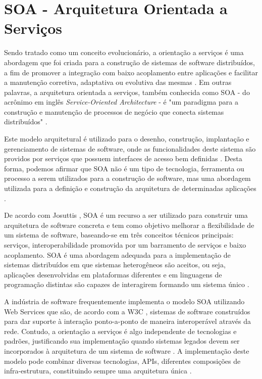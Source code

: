\section{SOA - Arquitetura Orientada a Serviços}

Sendo tratado como um conceito evolucionário, a orientação a serviços é uma abordagem que foi criada para a construção de sistemas de software distribuídos, a fim de promover a integração com baixo acoplamento entre aplicações e facilitar a manutenção corretiva, adaptativa ou evolutiva das mesmas \cite{linthicum_soainrealworld_2007}. Em outras palavras, a arquitetura orientada a serviços, também conhecida como SOA - do acrônimo em inglês \textit{Service-Oriented Architecture} - é "um paradigma para a construção e manutenção de processos de negócio que conecta sistemas distribuídos" \cite{josuttis_soa_2007}.

Este modelo arquitetural é utilizado para o desenho, construção, implantação e gerenciamento de sistemas de software, onde as funcionalidades deste sistema são providos por serviços que possuem interfaces de acesso bem definidas \cite{lewis_getting_2010}. Desta forma, podemos afirmar que SOA não é um tipo de tecnologia, ferramenta ou processo a serem utilizados para a construção de software, mas uma abordagem utilizada para a definição e construção da arquitetura de determinadas aplicações \cite{oliveira_interoperabilidade}.

De acordo com Josuttis \cite{josuttis_soa_2007}, SOA é um recurso a ser utilizado para construir uma arquitetura de software concreta e tem como objetivo melhorar a flexibilidade de um sistema de software, baseando-se em três conceitos técnicos principais: serviços, interoperabilidade promovida por um barramento de serviços e baixo acoplamento. SOA é uma abordagem adequada para a implementação de sistemas distribuídos em que sistemas heterogêneos são aceitos, ou seja, aplicações desenvolvidas em plataformas diferentes e em linguagens de programação distintas são capazes de interagirem formando um sistema único \cite{josuttis_soa_2007}.

A indústria de software frequentemente implementa o modelo SOA utilizando Web Services que são, de acordo com a W3C \cite{haas_web_2004}, sistemas de software construídos para dar suporte à interação ponto-a-ponto de maneira interoperável através da rede. Contudo, a orientação a serviços é algo independente de tecnologias e padrões, justificando sua implementação quando sistemas legados devem ser incorporados à arquitetura de um sistema de software \cite{linthicum_soainrealworld_2007}. A implementação deste modelo pode combinar diversas tecnologias, APIs, diferentes composições de infra-estrutura, constituindo sempre uma arquitetura única \cite{erl_orientacaoaservico_2009}.

